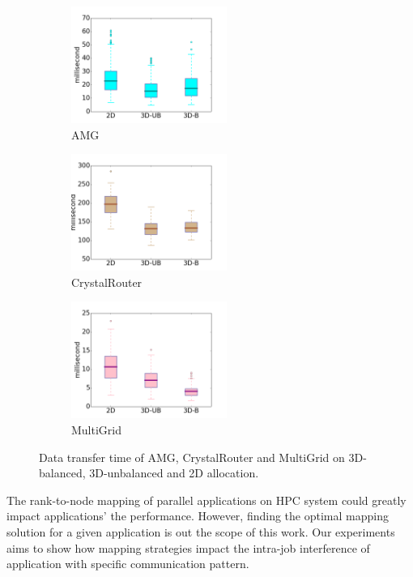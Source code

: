 \documentclass[conference]{IEEEtran}
\begin{document}
\begin{figure}[t!]
    \centering
    \begin{subfigure}[t]{0.32\textwidth}
        \centering
        \includegraphics[height=1.5in]{figs/intra-job/shapestudy/amg_box}
        \caption{AMG}
        \label{fig:shapstudy-amg}
    \end{subfigure}%
    \hspace{1em}%
    \begin{subfigure}[t]{0.32\textwidth}
        \centering
        \includegraphics[height=1.5in]{figs/intra-job/shapestudy/cr_box}
        \caption{CrystalRouter}
        \label{fig:shapstudy-cr}
    \end{subfigure}%
    \begin{subfigure}[t]{0.32\textwidth}
        \centering
        \includegraphics[height=1.5in]{figs/intra-job/shapestudy/mg_box}
        \caption{MultiGrid}
        \label{fig:shapstudy-mg}
    \end{subfigure}%
   \caption{Data transfer time of AMG, CrystalRouter and MultiGrid on 3D-balanced, 3D-unbalanced and 2D allocation.}
   \label{fig:shapestudy}
\end{figure}


The rank-to-node mapping of parallel applications on HPC system could greatly impact applications' the performance. However, finding the optimal mapping solution for a given application is out the scope of this work. Our experiments aims to show how mapping strategies impact the intra-job interference of application with specific communication pattern.
\end{document}
